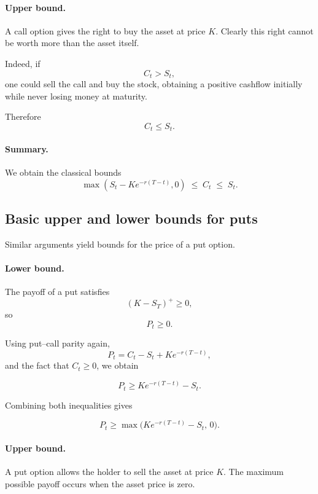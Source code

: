 \documentclass[11pt]{article}
\newcommand{\1}{\mathbf{1}}
\theoremstyle{plain}
\theoremstyle{definition}
\theoremstyle{remark}
\begin{document}
\paragraph{Upper bound.}

A call option gives the right to buy the asset at price \(K\).
Clearly this right cannot be worth more than the asset itself.

Indeed, if
\[
C_t > S_t,
\]
one could sell the call and buy the stock, obtaining a positive
cashflow initially while never losing money at maturity.

Therefore
\[
\boxed{
C_t \le S_t.
}
\]

\paragraph{Summary.}

We obtain the classical bounds
\[
\boxed{
\max(S_t-K e^{-r(T-t)},0)
\;\le\;
C_t
\;\le\;
S_t.
}
\]

\subsection{Basic upper and lower bounds for puts}

Similar arguments yield bounds for the price of a put option.

\paragraph{Lower bound.}

The payoff of a put satisfies
\[
(K-S_T)^+ \ge 0,
\]
so
\[
P_t \ge 0.
\]

Using put--call parity again,
\[
P_t = C_t - S_t + K e^{-r(T-t)},
\]
and the fact that \(C_t \ge 0\), we obtain

\[
\boxed{
P_t \ge K e^{-r(T-t)} - S_t.
}
\]

Combining both inequalities gives

\[
\boxed{
P_t \ge \max\!\big(K e^{-r(T-t)} - S_t,\,0\big).
}
\]

\paragraph{Upper bound.}

A put option allows the holder to sell the asset at price \(K\).
The maximum possible payoff occurs when the asset price is zero.
\end{document}
